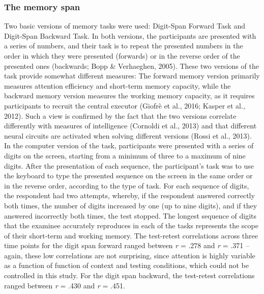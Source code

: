 \documentclass[authordate, empirical,issue]{jote-new-article}
\begin{document}
\subsubsection{The memory span}
Two basic versions of memory tasks were used: Digit-Span Forward Task and Digit-Span Backward Task. In both versions, the participants are presented with a series of numbers, and their task is to repeat the presented numbers in the order in which they were presented (forwards) or in the reverse order of the presented ones (backwards; Bopp \& Verhaeghen, 2005). These two versions of the task provide somewhat different measures: The forward memory version primarily measures attention efficiency and short-term memory capacity, while the backward memory version measures the working memory capacity, as it requires participants to recruit the central executor (Giofrè et al., 2016; Kasper et al., 2012). Such a view is confirmed by the fact that the two versions correlate differently with measures of intelligence (Cornoldi et al., 2013) and that different neural circuits are activated when solving different versions (Rossi et al., 2013). In the computer version of the task, participants were presented with a series of digits on the screen, starting from a minimum of three to a maximum of nine digits. After the presentation of each sequence, the participant's task was to use the keyboard to type the presented sequence on the screen in the same order or in the reverse order, according to the type of task. For each sequence of digits, the respondent had two attempts, whereby, if the respondent answered correctly both times, the number of digits increased by one (up to nine digits), and if they answered incorrectly both times, the test stopped. The longest sequence of digits that the examinee accurately reproduces in each of the tasks represents the scope of their short-term and working memory. The test-retest correlations across three time points for the digit span forward ranged between\emph{ r} = .278 and \emph{r} = .371 -- again, these low correlations are not surprising, since attention is highly variable as a function of function of context and testing conditions, which could not be controlled in this study. For the digit span backward, the test-retest correlations ranged between \emph{r} = .430 and \emph{r} = .451.
\end{document}
